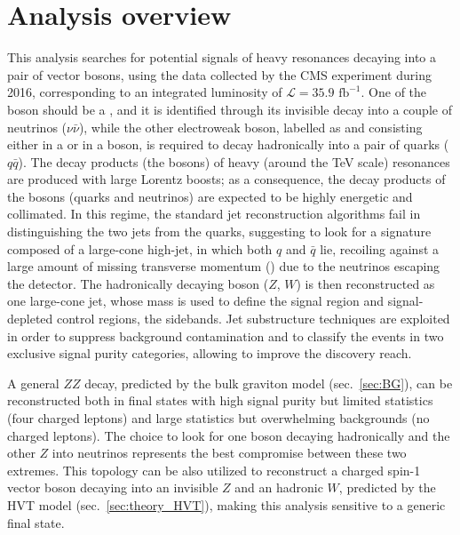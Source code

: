 \section{Analysis overview}
\label{sec:analysis_overview}

This analysis searches for potential signals of heavy resonances decaying into a pair of vector bosons, using the data collected by the CMS experiment during 2016, corresponding to an integrated luminosity of $\mathcal{L}=35.9 \mbox{ fb}^{-1}$. One of the boson should be a \Z, and it is identified through its invisible decay into a couple of neutrinos ($\nu \bar{\nu}$), while the other electroweak boson, labelled as \V and consisting either in a \W or in a \Z boson, is required to decay hadronically into a pair of quarks ($q \bar{q}$). %
The decay products (the bosons) of heavy (around the TeV scale) resonances are produced with large Lorentz boosts; as a consequence, the decay products of the bosons (quarks and neutrinos) are expected to be highly energetic and collimated. In this regime, the standard jet reconstruction algorithms fail in distinguishing the two jets from the quarks, suggesting to look for a signature composed of a large-cone high-\pt jet, in which both $q$ and $\bar{q}$ lie, recoiling against a large amount of missing transverse momentum (\met) due to the neutrinos escaping the detector. The hadronically decaying boson ($Z$, $W$) is then reconstructed as one large-cone jet, whose mass is used to define the signal region and signal-depleted control regions, the sidebands. Jet substructure techniques are exploited in order to suppress background contamination and to classify the events in two exclusive signal purity categories, allowing to improve the discovery reach.

\noindent A general $ZZ$ decay, predicted by the bulk graviton model (sec.~\ref{sec:BG}), can be reconstructed both in final states with high signal purity but limited statistics (four charged leptons) and large statistics but overwhelming backgrounds (no charged leptons). The choice to look for one boson decaying hadronically and the other $Z$ into neutrinos represents the best compromise between these two extremes. This topology can be also utilized to reconstruct a charged spin-1 vector boson \Wp decaying into an invisible $Z$ and an hadronic $W$, predicted by the HVT model (sec.~\ref{sec:theory_HVT}), making this analysis sensitive to a generic \VZ final state.

